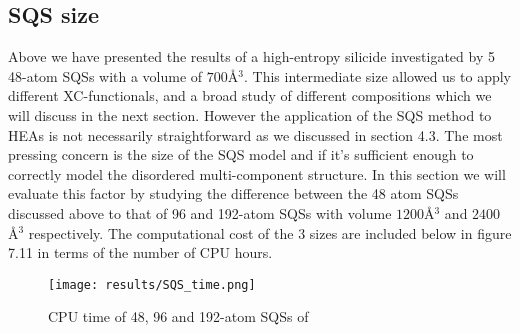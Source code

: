 \newpage
\subsection{SQS size}
Above we have presented the results of a high-entropy silicide  investigated by 5 48-atom SQSs with a volume of $700$\r{A}$^3$. This intermediate size allowed us to apply different XC-functionals, and a broad study of different compositions which we will discuss in the next section. However the application of the SQS method to HEAs is not necessarily straightforward as we discussed in section 4.3. The most pressing concern is the size of the SQS model and if it's sufficient enough to correctly model the disordered multi-component structure. In this section we will evaluate this factor by studying the difference between the 48 atom SQSs discussed above to that of 96 and 192-atom SQSs with volume $1200$\r{A}$^3$ and $2400$ \r{A}$^3$ respectively. The computational cost of the 3 sizes are included below in figure 7.11 in terms of the number of CPU hours.

\begin{figure}[H]
\centering
\texttt{[image: results/SQS\_time.png]}
\caption{CPU time of 48, 96 and 192-atom SQSs of }
\end{figure}

